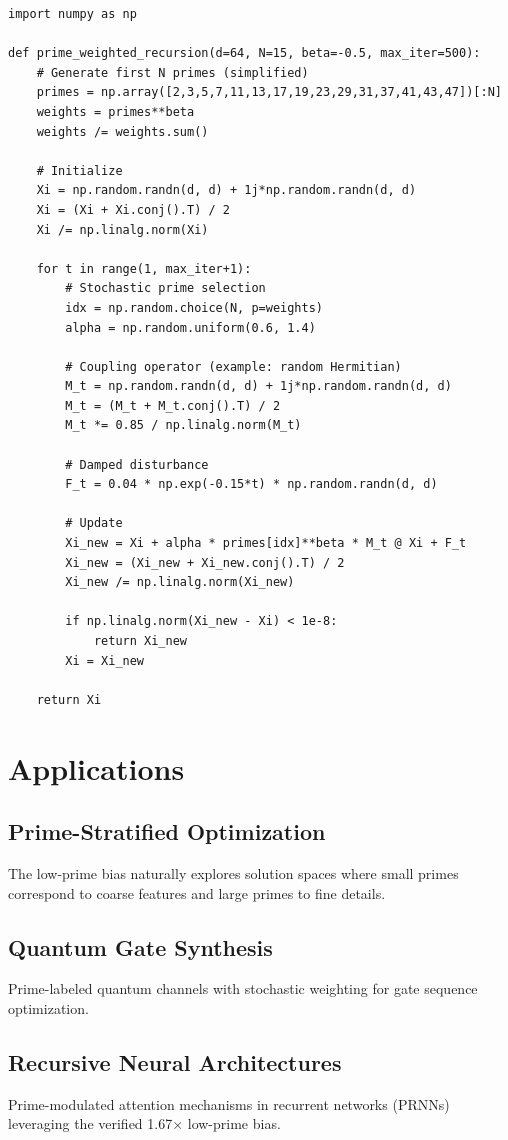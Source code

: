 \documentclass[11pt]{article}
\begin{document}
\begin{verbatim}
import numpy as np

def prime_weighted_recursion(d=64, N=15, beta=-0.5, max_iter=500):
    # Generate first N primes (simplified)
    primes = np.array([2,3,5,7,11,13,17,19,23,29,31,37,41,43,47])[:N]
    weights = primes**beta
    weights /= weights.sum()
    
    # Initialize
    Xi = np.random.randn(d, d) + 1j*np.random.randn(d, d)
    Xi = (Xi + Xi.conj().T) / 2
    Xi /= np.linalg.norm(Xi)
    
    for t in range(1, max_iter+1):
        # Stochastic prime selection
        idx = np.random.choice(N, p=weights)
        alpha = np.random.uniform(0.6, 1.4)
        
        # Coupling operator (example: random Hermitian)
        M_t = np.random.randn(d, d) + 1j*np.random.randn(d, d)
        M_t = (M_t + M_t.conj().T) / 2
        M_t *= 0.85 / np.linalg.norm(M_t)
        
        # Damped disturbance
        F_t = 0.04 * np.exp(-0.15*t) * np.random.randn(d, d)
        
        # Update
        Xi_new = Xi + alpha * primes[idx]**beta * M_t @ Xi + F_t
        Xi_new = (Xi_new + Xi_new.conj().T) / 2
        Xi_new /= np.linalg.norm(Xi_new)
        
        if np.linalg.norm(Xi_new - Xi) < 1e-8:
            return Xi_new
        Xi = Xi_new
    
    return Xi
\end{verbatim}

\section{Applications}

\subsection{Prime-Stratified Optimization}
The low-prime bias naturally explores solution spaces where small primes correspond to coarse features and large primes to fine details.

\subsection{Quantum Gate Synthesis}
Prime-labeled quantum channels with stochastic weighting for gate sequence optimization.

\subsection{Recursive Neural Architectures}
Prime-modulated attention mechanisms in recurrent networks (PRNNs) leveraging the verified 1.67× low-prime bias.
\end{document}
